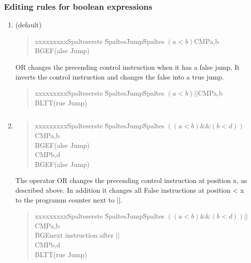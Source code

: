 \subsubsection{Editing rules for boolean expressions}
\begin{enumerate}
  \item (default)
  \begin{quote}
	\begin{tabbing}
	xxxxxxxxxSpalteserste \= Spaltes\=  Jump\= Spaltes \kill
	$(a<b)$\>CMP\>a,b\\
	\>BGE\>\>F(alse Jump)\\
	\end{tabbing}
	\end{quote}
OR changes the precending control instruction when it has a false jump. It inverts the control instruction and changes the false into a true
  jump.
    \begin{quote}
	\begin{tabbing}
	xxxxxxxxxSpalteserste \= Spaltes\=  Jump\= Spaltes \kill
	$(a<b) || $\>CMP\>a,b\\
	\>BLT\>\>T(rue Jump)\\
	\end{tabbing}
	\end{quote}
\begin{verbatim}

\end{verbatim}
    \item
    
  \begin{quote}
	\begin{tabbing}
	xxxxxxxxxSpalteserste \= Spaltes\=  Jump\= Spaltes \kill
	$((a<b) \&\&  (b<d))$\>CMP\>a,b\\
	\>BGE\>\>F(alse Jump)\\
	\>CMP\>b,d\\
	\>BGE\>\>F(alse Jump)\\
	\end{tabbing}
	\end{quote}
      The operator OR changes the precending control instruction at position x, as described above. In addition it changes all False
      instructions at position < x to the programm counter next to $||$.  
  \begin{quote}
	\begin{tabbing}
	xxxxxxxxxSpalteserste \= Spaltes\=  Jump\= Spaltes \kill
	$((a<b) \&\&  (b<d))||$\>CMP\>a,b\\
	\>BGE\>\>next instruction after $||$\\
	\>CMP\>b,d\\
	\>BLT\>\>T(rue Jump)\\
	\end{tabbing}
	\end{quote}
\begin{verbatim}


\end{verbatim}
\end{enumerate}
